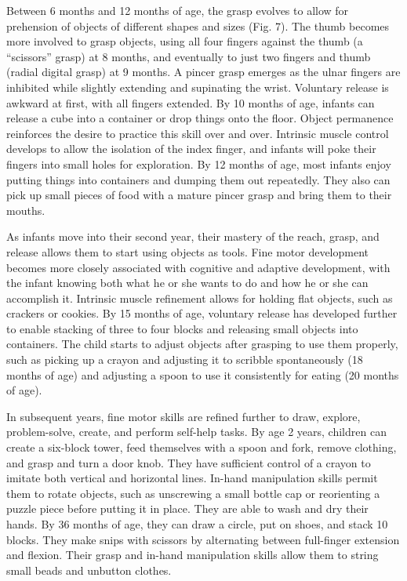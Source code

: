 Between 6 months and 12 months of age, the grasp evolves to allow for
prehension of objects of different shapes and sizes (Fig. 7). The thumb becomes
more involved to grasp objects, using all four fingers against the thumb (a
“scissors” grasp) at 8 months, and eventually to just two fingers and thumb
(radial digital grasp) at 9 months. A pincer grasp emerges as the ulnar fingers
are inhibited while slightly extending and supinating the wrist. Voluntary
release is awkward at first, with all fingers extended. By 10 months of age,
infants can release a cube into a container or drop things onto the floor.
Object permanence reinforces the desire to practice this skill over and over.
Intrinsic muscle control develops to allow the isolation of the index finger,
and infants will poke their fingers into small holes for exploration. By 12
months of age, most infants enjoy putting things into containers and dumping
them out repeatedly. They also can pick up small pieces of food with a mature
pincer grasp and bring them to their mouths. \cite{Gerber2010}

As infants move into their second year, their mastery of the reach, grasp, and
release allows them to start using objects as tools. Fine motor development
becomes more closely associated with cognitive and adaptive development, with
the infant knowing both what he or she wants to do and how he or she can
accomplish it. Intrinsic muscle refinement allows for holding flat objects,
such as crackers or cookies. By 15 months of age, voluntary release has
developed further to enable stacking of three to four blocks and releasing
small objects into containers. The child starts to adjust objects after
grasping to use them properly, such as picking up a crayon and adjusting it to
scribble spontaneously (18 months of age) and adjusting a spoon to use it
consistently for eating (20 months of age). \cite{Gerber2010}

In subsequent years, fine motor skills are refined further to draw, explore,
problem-solve, create, and perform self-help tasks. By age 2 years, children
can create a six-block tower, feed themselves with a spoon and fork, remove
clothing, and grasp and turn a door knob. They have sufficient control of a
crayon to imitate both vertical and horizontal lines. In-hand manipulation
skills permit them to rotate objects, such as unscrewing a small bottle cap or
reorienting a puzzle piece before putting it in place. They are able to wash
and dry their hands. By 36 months of age, they can draw a circle, put on shoes,
and stack 10 blocks. They make snips with scissors by alternating between
full-finger extension and flexion. Their grasp and in-hand manipulation skills
allow them to string small beads and unbutton clothes. \cite{Gerber2010}

